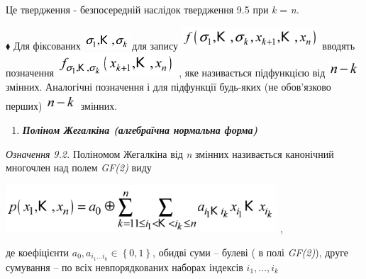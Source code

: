 \documentclass[a4paper]{article}
\newcommand\liststyleWWviiiNumlii{%
\renewcommand\theenumi{\arabic{enumi}}
\renewcommand\theenumii{\arabic{enumii}}
\renewcommand\theenumiii{\arabic{enumiii}}
\renewcommand\theenumiv{\arabic{enumiv}}
\renewcommand\labelenumi{\theenumi.}
\renewcommand\labelenumii{\theenumii.}
\renewcommand\labelenumiii{\theenumiii.}
\renewcommand\labelenumiv{\theenumiv.}
}
\newcounter{}
\begin{document}
 Це твердження  {}- безпосередній наслідок твердження  9.5\textit{  }при 
\textit{k}\textit{ }=\textit{ }\textit{n}\textit{.}

${\blacklozenge}$ Для фіксованих 
\includegraphics[width=0.6571in,height=0.248in]{crypt-img/crypt-img113.png} 
для запису 
\includegraphics[width=2.0201in,height=0.3346in]{crypt-img/crypt-img114.png} 
вводять позначення 
\includegraphics[width=1.7398in,height=0.3535in]{crypt-img/crypt-img115.png} , 
яке називається підфункцією від  
\includegraphics[width=0.4681in,height=0.2409in]{crypt-img/crypt-img116.png} 
змінних. Аналогічні позначення і для підфункції будь-яких (не обов’язково
перших) 
\includegraphics[width=0.4681in,height=0.2409in]{crypt-img/crypt-img117.png}
змінних. 


\bigskip

\liststyleWWviiiNumlii
\begin{enumerate}
\item {\bfseries\itshape
Поліном Жегалкіна (алгебраїчна  нормальна форма)}
\end{enumerate}
 \textit{Означення }\textit{9.}\textit{2.}\textit{  }Поліномом Жегалкіна від
\textit{n} змінних називається канонічний многочлен над полем \textit{GF(2)
}\textit{ }виду

{\centering
 \includegraphics[width=3.9835in,height=0.7in]{crypt-img/crypt-img118.png} , 
\par}

де коефіцієнти   ${a_{{0}},a_{{i_{{1}}\text{.}\text{.}\text{.}i_{{k}}}}\in
\left\{0,1\right\}}$, обидві суми – булеві ( в полі \textit{GF(2)}), друге
сумування – по всіх невпорядкованих наборах  індексів 
${i_{{1}},\text{.}\text{.}\text{.},i_{{k}}}$\textit{ }\textit{ }
\end{document}
